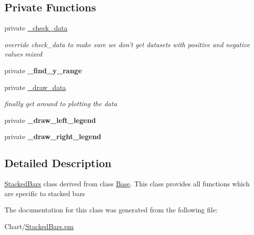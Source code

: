 \subsection*{Private Functions}
\label{_amgrp8d29cff216bafa3117e21883ea7c6b5f}
 \begin{DoxyCompactItemize}
\item 
\hypertarget{classChart_1_1StackedBars_a8d772463780f75cc985ae890ad8a94d1}{
private \hyperlink{classChart_1_1StackedBars_a8d772463780f75cc985ae890ad8a94d1}{\_\-check\_\-data}}
\label{classChart_1_1StackedBars_a8d772463780f75cc985ae890ad8a94d1}

\begin{DoxyCompactList}\small\item\em override check\_\-data to make sure we don't get datasets with positive and negative values mixed \item\end{DoxyCompactList}\item 
\hypertarget{classChart_1_1StackedBars_a3b2346b67bdcae53e756dc29bb0cf748}{
private {\bfseries \_\-find\_\-y\_\-range}}
\label{classChart_1_1StackedBars_a3b2346b67bdcae53e756dc29bb0cf748}

\item 
\hypertarget{classChart_1_1StackedBars_abacb5ba7afd1090c229d8f0ba9a56ddb}{
private \hyperlink{classChart_1_1StackedBars_abacb5ba7afd1090c229d8f0ba9a56ddb}{\_\-draw\_\-data}}
\label{classChart_1_1StackedBars_abacb5ba7afd1090c229d8f0ba9a56ddb}

\begin{DoxyCompactList}\small\item\em finally get around to plotting the data \item\end{DoxyCompactList}\item 
\hypertarget{classChart_1_1StackedBars_a7138f939a7d0f5c21a53bee45939717c}{
private {\bfseries \_\-draw\_\-left\_\-legend}}
\label{classChart_1_1StackedBars_a7138f939a7d0f5c21a53bee45939717c}

\item 
\hypertarget{classChart_1_1StackedBars_aad01909f5d3a6af9e014926f2a026014}{
private {\bfseries \_\-draw\_\-right\_\-legend}}
\label{classChart_1_1StackedBars_aad01909f5d3a6af9e014926f2a026014}

\end{DoxyCompactItemize}


\subsection{Detailed Description}
\hyperlink{classChart_1_1StackedBars}{StackedBars} class derived from class \hyperlink{classChart_1_1Base}{Base}. This class provides all functions which are specific to stacked bars 

The documentation for this class was generated from the following file:\begin{DoxyCompactItemize}
\item 
Chart/\hyperlink{StackedBars_8pm}{StackedBars.pm}\end{DoxyCompactItemize}
